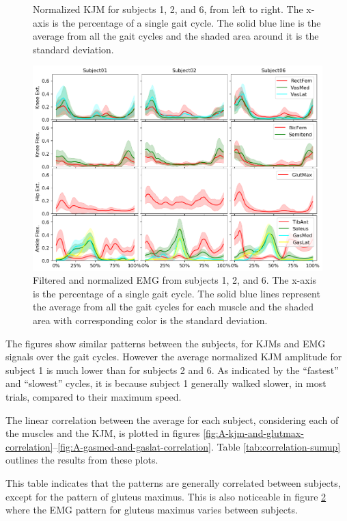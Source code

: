\documentclass[../main.tex]{subfiles}
\begin{document}
\begin{figure}[ht!]
\begin{subfigure}[b]{0.328\textwidth}
     \end{subfigure}
    \caption{Normalized \ac{KJM} for subjects 1, 2, and 6, from left to right. The x-axis is the percentage of a single gait cycle. The solid blue line is the average from all the gait cycles and the shaded area around it is the standard deviation.}
    \label{fig:kjm-average}
\end{figure}
\begin{figure}[ht!]
    \centering
    \includegraphics[width=\textwidth]{img/results/emg_avg/all_subject_grid_emg_avg.png}
    \caption{Filtered and normalized \ac{EMG} from subjects 1, 2, and 6. The x-axis is the percentage of a single gait cycle. The solid blue lines represent the average from all the gait cycles for each muscle and the shaded area with corresponding color is the standard deviation.}
    \label{fig:emg-average}
\end{figure}
The figures show similar patterns between the subjects, for \acp{KJM} and \ac{EMG} signals over the gait cycles.
However the average normalized \ac{KJM} amplitude for subject 1 is much lower than for subjects 2 and 6.
As indicated by the ``fastest'' and ``slowest'' cycles, it is because subject 1 generally walked slower, in most trials, compared to their maximum speed.

The linear correlation between the average for each subject, considering each of the muscles and the \ac{KJM}, is plotted in figures \ref{fig:A-kjm-and-glutmax-correlation}--\ref{fig:A-gasmed-and-gaslat-correlation}.
Table \ref{tab:correlation-sumup} outlines the results from these plots.

This table indicates that the patterns are generally correlated between subjects, except for the pattern of gluteus maximus.
This is also noticeable in figure \ref{fig:emg-average} where the \ac{EMG} pattern for gluteus maximus varies between subjects.
\end{document}
